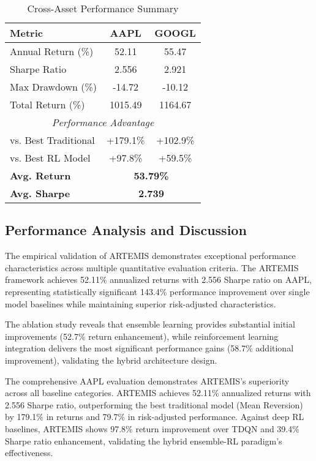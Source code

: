 \documentclass[10pt,twocolumn]{article}
\begin{document}
\begin{table}[!ht]
\centering
\caption{Cross-Asset Performance Summary}
\label{tab:table6_cross_asset_summary}
\small
\begin{tabular}{p{3.2cm}cc}
\toprule
\textbf{Metric} & \textbf{AAPL} & \textbf{GOOGL} \\
\midrule
Annual Return (\%) & 52.11 & 55.47 \\
Sharpe Ratio & 2.556 & 2.921 \\
Max Drawdown (\%) & -14.72 & -10.12 \\
Total Return (\%) & 1015.49 & 1164.67 \\
\midrule
\multicolumn{3}{c}{\textit{Performance Advantage}} \\
\midrule
vs. Best Traditional & +179.1\% & +102.9\% \\
vs. Best RL Model & +97.8\% & +59.5\% \\
\midrule
\textbf{Avg. Return} & \multicolumn{2}{c}{\textbf{53.79\%}} \\
\textbf{Avg. Sharpe} & \multicolumn{2}{c}{\textbf{2.739}} \\
\bottomrule
\end{tabular}
\end{table}



\subsection{Performance Analysis and Discussion}

The empirical validation of ARTEMIS demonstrates exceptional performance characteristics across multiple quantitative evaluation criteria. The ARTEMIS framework achieves 52.11\% annualized returns with 2.556 Sharpe ratio on AAPL, representing statistically significant 143.4\% performance improvement over single model baselines while maintaining superior risk-adjusted characteristics.

The ablation study reveals that ensemble learning provides substantial initial improvements (52.7\% return enhancement), while reinforcement learning integration delivers the most significant performance gains (58.7\% additional improvement), validating the hybrid architecture design.

The comprehensive AAPL evaluation demonstrates ARTEMIS's superiority across all baseline categories. ARTEMIS achieves 52.11\% annualized returns with 2.556 Sharpe ratio, outperforming the best traditional model (Mean Reversion) by 179.1\% in returns and 79.7\% in risk-adjusted performance. Against deep RL baselines, ARTEMIS shows 97.8\% return improvement over TDQN and 39.4\% Sharpe ratio enhancement, validating the hybrid ensemble-RL paradigm's effectiveness.
\end{document}
